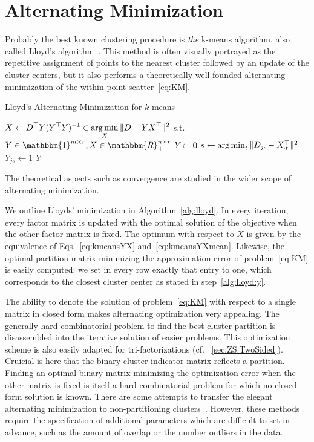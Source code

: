 \section{Alternating Minimization}\label{sec:ZS:Lloyds}
Probably the best known clustering procedure is \emph{the} k-means algorithm, also called Lloyd's algorithm~\citep{lloyd1982least}. This method is often visually portrayed as the repetitive assignment of points to the nearest cluster followed by an update of the cluster centers, but it also performs a theoretically well-founded alternating minimization of the within point scatter~\eqref{eq:KM}.
\begin{algorithm}[t]
\caption{Lloyd's Alternating Minimization for $k$-means} 
\begin{algorithmic}[1]
    \State $\displaystyle X \gets D^\top Y(Y^\top Y)^{-1} \in  \operatorname*{arg\,min}_{X}\|D-YX^\top\|^2$ s.t. $Y\in\mathbbm{1}^{m\times r},X\in\mathbbm{R}_+^{n\times r}$
    \State $Y\gets \mathbf{0}$
        \State $s\gets \operatorname*{arg\,min}_t\|D_{j\cdot}-X_{\cdot t}^\top\|^2$ \label{alg:lloyd:y}
        \State $Y_{js}\gets 1$
    \EndFor
\EndFor
  \State \Return $Y$
  \EndFunction
\end{algorithmic}
\label{alg:lloyd}
\end{algorithm}
The theoretical aspects such as convergence are studied in the wider scope of alternating minimization. 

We outline Lloyds' minimization in Algorithm~\ref{alg:lloyd}. In every iteration, every factor matrix is updated with the optimal solution of the objective when the other factor matrix is fixed. The optimum with respect to $X$ is given by the equivalence of Eqs.~\eqref{eq:kmeansYX} and~\eqref{eq:kmeansYXmean}. Likewise, the optimal partition matrix minimizing the approximation error of problem~\eqref{eq:KM} is easily computed: we set in every row exactly that entry to one, which corresponds to the closest cluster center as stated in step~\ref{alg:lloyd:y}.

The ability to denote the solution of problem~\eqref{eq:KM} with respect to a single matrix in closed form makes alternating optimization very appealing. The generally hard combinatorial problem to find the best cluster partition is disassembled into the iterative solution of easier problems. This optimization scheme is also easily adapted for tri-factorizations (cf. \@Section~\ref{sec:ZS:TwoSided}). Cruicial is here that the binary cluster indicator matrix reflects a partition. Finding an optimal binary matrix minimizing the optimization error when the other matrix is fixed is itself a hard combinatorial problem for which no closed-form solution is known.
There are some attempts to transfer the elegant alternating minimization to non-partitioning clusters~\citep{chawla2013kmeans,whang2018non}. However, these methods require the specification of additional parameters which are difficult to set in advance, such as the amount of overlap or the number outliers in the data.

